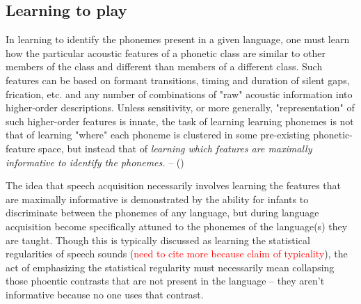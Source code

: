 \begin{multicols}{2}

\subsection{Learning to play}




In learning to identify the phonemes present in a given language, one must learn how the particular acoustic features of a phonetic class are similar to other members of the class and different than members of a different class. Such features can be based on formant transitions, timing and duration of silent gaps, frication, etc. and any number of combinations of "raw" acoustic information into higher-order descriptions. Unless sensitivity, or more generally, "representation" of such higher-order features is innate, the task of learning learning phonemes is not that of learning "where" each phoneme is clustered in some pre-existing phonetic-feature space, but instead that of \textit{learning which features are maximally informative to identify the phonemes.}\cite{kluenderLongstandingProblemsSpeech2019a} -- ()

The idea that speech acquisition necessarily involves learning the features that are maximally informative is demonstrated by the ability for infants to discriminate between the phonemes of any language, but during language acquisition become specifically attuned to the phonemes of the language(s) they are taught. Though this is typically discussed as learning the statistical regularities of speech  sounds (\textcolor{red}{need to cite more because claim of typicality}\cite{kuhlPhoneticLearningPathway2008}\cite{kuhlEarlyLanguageAcquisition2004}), the act of emphasizing the statistical regularity must necessarily mean collapsing those phoentic contrasts that are not present in the language -- they aren't informative because no one uses that contrast. 



\end{multicols}
